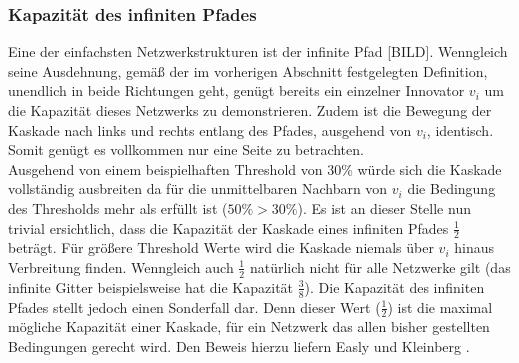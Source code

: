 \documentclass[12pt]{article}
\begin{document}
\subsubsection{Kapazität des infiniten Pfades}
Eine der einfachsten Netzwerkstrukturen ist der infinite Pfad [BILD]. Wenngleich seine Ausdehnung, gemäß der im vorherigen Abschnitt festgelegten Definition, unendlich in beide Richtungen geht, genügt bereits ein einzelner Innovator $v_i$ um die Kapazität dieses Netzwerks zu demonstrieren. Zudem ist die Bewegung der Kaskade nach links und rechts entlang des Pfades, ausgehend von $v_i$, identisch. Somit genügt es vollkommen nur eine Seite zu betrachten.\\
Ausgehend von einem beispielhaften Threshold von $30\%$ würde sich die Kaskade vollständig ausbreiten da für die unmittelbaren Nachbarn von $v_i$ die Bedingung des Thresholds mehr als erfüllt ist ($50\% > 30\%$). Es ist an dieser Stelle nun trivial ersichtlich, dass die Kapazität der Kaskade eines infiniten Pfades $\frac{1}{2}$ beträgt. Für größere Threshold Werte wird die Kaskade niemals über $v_i$ hinaus Verbreitung finden. Wenngleich auch $\frac{1}{2}$ natürlich nicht für alle Netzwerke gilt (das infinite Gitter beispielsweise hat die Kapazität $\frac{3}{8}$). Die Kapazität des infiniten Pfades stellt jedoch einen Sonderfall dar. Denn dieser Wert ($\frac{1}{2}$) ist die maximal mögliche Kapazität einer Kaskade, für ein Netzwerk das allen bisher gestellten Bedingungen gerecht wird. Den Beweis hierzu liefern Easly und Kleinberg \cite{Easly10}. 
\end{document}
